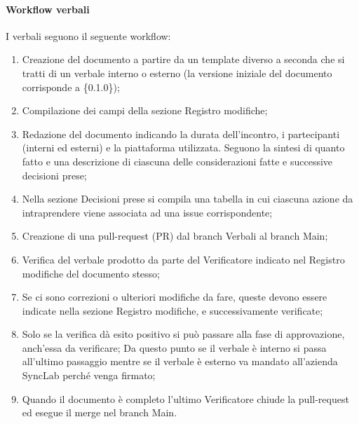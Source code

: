 \documentclass[10pt]{article}
\begin{document}
\begin{justify}
        \paragraph{Workflow verbali}
        I verbali seguono il seguente workflow:
        \begin{enumerate}
            \item Creazione del documento a partire da un template diverso a seconda che si tratti di un verbale interno o esterno (la versione iniziale del documento corrisponde a \{0.1.0\});
            \item Compilazione dei campi della sezione Registro modifiche;
            \item Redazione del documento indicando la durata dell'incontro, i partecipanti (interni ed esterni) e la piattaforma utilizzata. Seguono la sintesi di quanto fatto e una descrizione di ciascuna delle considerazioni fatte e successive decisioni prese;
            \item Nella sezione Decisioni prese si compila una
            tabella in cui ciascuna azione da intraprendere viene associata ad una issue corrispondente;
            \item Creazione di una pull-request (PR) dal branch Verbali al branch Main;
            \item Verifica del verbale prodotto da parte del Verificatore
            indicato nel Registro modifiche del documento stesso;
            \item Se ci sono correzioni o ulteriori modifiche da fare, queste devono essere indicate nella sezione Registro modifiche, e successivamente verificate;
            \item Solo se la verifica dà esito positivo si può passare alla fase di approvazione, anch'essa da verificare;
            Da questo punto se il verbale è interno si passa all'ultimo passaggio mentre se il verbale è esterno va mandato all'azienda SyncLab perché venga firmato;
            \item Quando il documento è completo l'ultimo Verificatore
            chiude la pull-request ed esegue il merge nel branch Main.
        \end{enumerate}


\end{justify}
\end{document}
